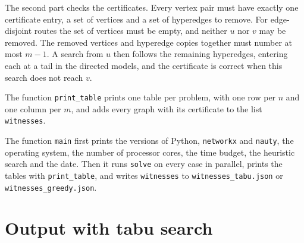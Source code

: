 
The second part checks the certificates. Every vertex pair must have exactly one certificate entry, a set of vertices and a set of hyperedges to remove. For edge-disjoint routes the set of vertices must be empty, and neither $u$ nor $v$ may be removed. The removed vertices and hyperedge copies together must number at most $m-1$. A search from $u$ then follows the remaining hyperedges, entering each at a tail in the directed models, and the certificate is correct when this search does not reach $v$.


The function \texttt{print\_table} prints one table per problem, with one row per $n$ and one column per $m$, and adds every graph with its certificate to the list \texttt{witnesses}.


The function \texttt{main} first prints the versions of Python, \texttt{networkx} and \texttt{nauty}, the operating system, the number of processor cores, the time budget, the heuristic search and the date. Then it runs \texttt{solve} on every case in parallel, prints the tables with \texttt{print\_table}, and writes \texttt{witnesses} to \texttt{witnesses\_tabu.json} or \texttt{witnesses\_greedy.json}.


\clearpage
\section{Output with tabu search}\label{sec:output}

